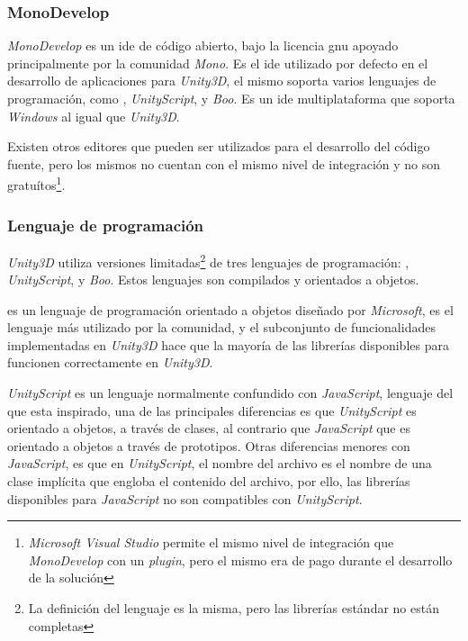 \subsubsection{MonoDevelop}

\textit{MonoDevelop} es un \Gls{ide} de código abierto, bajo la licencia
\Gls{gnu} apoyado principalmente por la comunidad \textit{Mono}. Es el \Gls{ide}
utilizado por defecto en el desarrollo de aplicaciones para \textit{Unity3D}, el
mismo soporta varios lenguajes de programación, como \cs{},
\textit{UnityScript}, y \textit{Boo}. Es un \Gls{ide} multiplataforma que
soporta \textit{Windows} al igual que \textit{Unity3D}.

Existen otros editores que pueden ser utilizados para el desarrollo del código
fuente, pero los mismos no cuentan con el mismo nivel de integración y no son
gratuítos\footnote{\textit{Microsoft Visual Studio} permite el mismo nivel de
    integración que \textit{MonoDevelop} con un \textit{plugin}, pero el mismo
    era de pago durante el desarrollo de la solución}.

\subsubsection{Lenguaje de programación}


\textit{Unity3D} utiliza versiones limitadas\footnote{La definición del lenguaje
    es la misma, pero las librerías estándar no están completas} de tres
lenguajes de programación: \cs{}, \textit{UnityScript}, y
\textit{Boo}\cite{unity:script}. Estos lenguajes son compilados y orientados a
objetos.

\cs{} es un lenguaje de programación orientado a objetos diseñado por
\textit{Microsoft}, es el lenguaje más utilizado por la comunidad, y el
subconjunto de funcionalidades implementadas en \textit{Unity3D} hace que la
mayoría de las librerías disponibles para \cs{} funcionen correctamente en
\textit{Unity3D}.

\textit{UnityScript} es un lenguaje normalmente confundido con
\textit{JavaScript}, lenguaje del que esta inspirado, una de las principales
diferencias es que \textit{UnityScript} es orientado a objetos, a través de
clases, al contrario que \textit{JavaScript} que es orientado a objetos a través
de prototipos. Otras diferencias menores con \textit{JavaScript}, es que en
\textit{UnityScript}, el nombre del archivo es el nombre de una clase implícita
que engloba el contenido del archivo\cite{us_vs_js}, por ello, las librerías
disponibles para \textit{JavaScript} no son compatibles con
\textit{UnityScript}.

